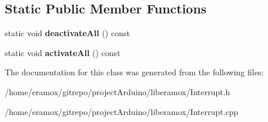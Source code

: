 \subsection*{Static Public Member Functions}
\begin{DoxyCompactItemize}
\item 
static void {\bfseries deactivate\+All} () const \hypertarget{classliberamox_1_1Interrupt_aaf2ef5067146e096e702e787d41db7ad}{}\label{classliberamox_1_1Interrupt_aaf2ef5067146e096e702e787d41db7ad}

\item 
static void {\bfseries activate\+All} () const \hypertarget{classliberamox_1_1Interrupt_a7ec2cd66ed040383a9e73f84d8a4c584}{}\label{classliberamox_1_1Interrupt_a7ec2cd66ed040383a9e73f84d8a4c584}

\end{DoxyCompactItemize}


The documentation for this class was generated from the following files\+:\begin{DoxyCompactItemize}
\item 
/home/eramox/gitrepo/project\+Arduino/liberamox/Interrupt.\+h\item 
/home/eramox/gitrepo/project\+Arduino/liberamox/Interrupt.\+cpp\end{DoxyCompactItemize}
